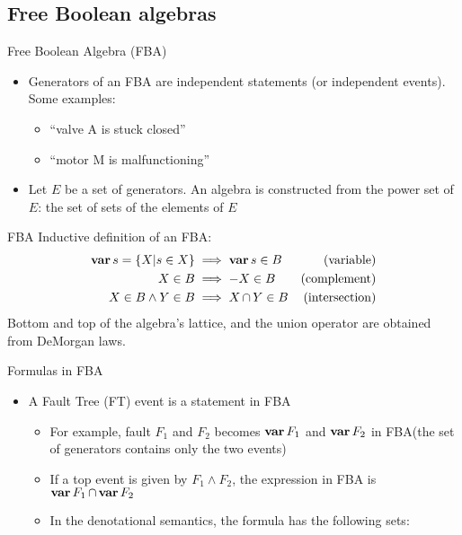 \documentclass{beamer}
\def\FT{%
	Fault Tree (FT)%
	\gdef\FT{FT\xspace}%
	\gdef\FTs{FTs\xspace}%
	\gdef\IFT{An FT\xspace}%
	\xspace%
}
\def\FTs{%
	Fault Trees (FTs)%
	\gdef\FT{FT\xspace}%
	\gdef\FTs{FTs\xspace}%
	\gdef\IFT{An FT\xspace}%
	\xspace%
}
\def\IFT{%
	A Fault Tree (FT)%
	\gdef\FT{FT\xspace}%
	\gdef\FTs{FTs\xspace}%
	\gdef\IFT{An FT\xspace}%
	\xspace%
}
\def\FBA{%
	Free Boolean Algebra (FBA)%
	\gdef\FBA{FBA\xspace}%
	\gdef\FBAs{FBAs\xspace}%
	\gdef\iFBA{an FBA\xspace}%
	\xspace%
}
\def\FBAs{%
	Free Boolean Algebras (FBAs)%
	\gdef\FBA{FBA\xspace}%
	\gdef\FBAs{FBAs\xspace}%
	\gdef\iFBA{an FBA\xspace}%
	\xspace%
}
\def\iFBA{%
	a Free Boolean Algebra (FBA)%
	\gdef\FBA{FBA\xspace}%
	\gdef\FBAs{FBAs\xspace}%
	\gdef\iFBA{an FBA\xspace}%
	\xspace%
}
\def\varop{\ensuremath\operatorname{\mathbf{var}}}
\newcommand{\var}[1]{\ensuremath\varop #1}
\def\inter{\ensuremath\operatorname{\cap}}
\begin{document}
\subsection{Free Boolean algebras}

\begin{frame}{\FBA}
	\begin{itemize}
		\item Generators of \iFBA are independent statements (or independent events). Some examples:
		\begin{itemize}
			\item ``valve A is stuck closed''
			\item ``motor M is malfunctioning''
		\end{itemize}
		\item Let $E$ be a set of generators. An algebra is constructed from the power set of $E$: the set of sets of the elements of $E$
	\end{itemize}
\end{frame}

\begin{frame}[fragile]{\FBA}
	Inductive definition of \iFBA:
	\begin{subequations}
		\begin{align}
		\var s = \{X | s \in X\} & \implies \var s \in B & \text{(variable)}\\
		X \in B & \implies -X \in B                           & \text{(complement)}\\
		X \in B \land Y \in B & \implies X \inter Y \in B     & \text{(intersection)}
		\end{align}
	\end{subequations}
	Bottom and top of the algebra's lattice, and the union operator are obtained from DeMorgan laws.
\end{frame}

\begin{frame}{Formulas in \FBA}
	\begin{itemize}
		\item \IFT event is a statement in \FBA
		\begin{itemize}
			\item For example, fault $F_1$ and $F_2$ becomes $\var F_1$ and $\var F_2$ in \FBA (the set of generators contains only the two events)
			\item If a top event is given by $F_1 \land F_2$, the expression in \FBA is $\var F_1 \inter \var F_2$
			\item In the denotational semantics, the formula has the following sets:
		\end{itemize}
	\end{itemize}
\end{frame}
\end{document}
